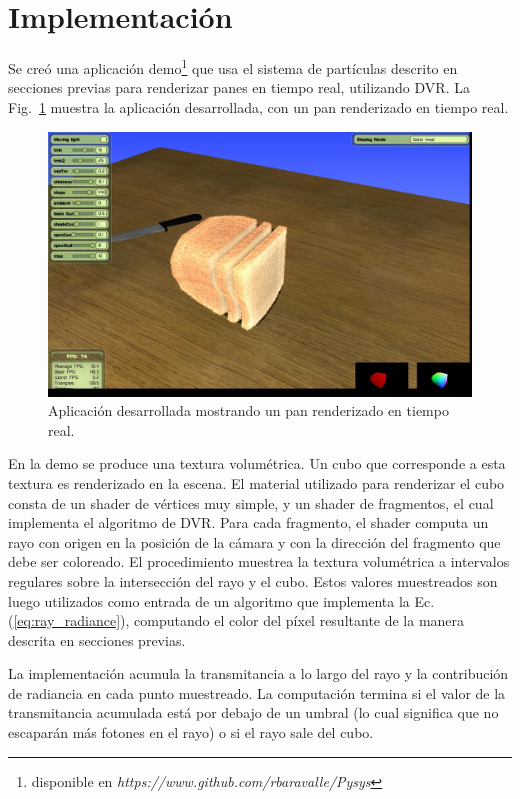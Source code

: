 \section{Implementación}

Se creó una aplicación demo\footnote{disponible en \emph{https://www.github.com/rbaravalle/Pysys}}  que usa el sistema de partículas descrito en secciones previas para renderizar panes en tiempo real, utilizando DVR.
La Fig.~\ref{fg:application} muestra la aplicación desarrollada, con un pan renderizado en tiempo real.


\begin{figure}
\centerline{\includegraphics[width=13cm]{figures/application}}
\caption{Aplicación desarrollada mostrando un pan renderizado en tiempo real.}
\label{fg:application}
\end{figure}


En la demo se produce una textura volumétrica.
Un cubo que corresponde a esta textura es renderizado en la escena.
El material utilizado para renderizar el cubo consta de un shader de vértices muy simple, y un shader de fragmentos, el cual implementa el algoritmo de DVR.
Para cada fragmento, el shader computa un rayo con origen en la posición de la cámara y con la dirección del fragmento que debe ser coloreado.
El procedimiento muestrea la textura volumétrica a intervalos regulares sobre la intersección del rayo y el cubo.
Estos valores muestreados son luego utilizados como entrada de un algoritmo que implementa la Ec. (\ref{eq:ray_radiance}), computando el color del píxel resultante de la manera descrita en secciones previas.

La implementación acumula la transmitancia a lo largo del rayo y la contribución de radiancia en cada punto muestreado.
La computación termina si el valor de la transmitancia acumulada está por debajo de un umbral (lo cual significa que no escaparán más fotones en el rayo) o si el rayo sale del cubo.

